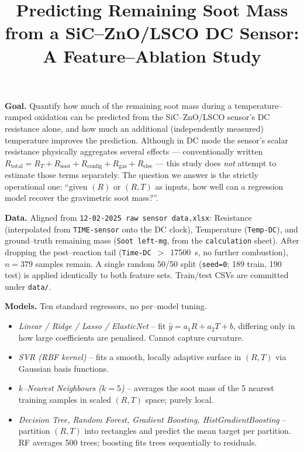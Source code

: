 \documentclass[10pt]{article}
\title{\vspace{-3em}Predicting Remaining Soot Mass from a SiC--ZnO/LSCO DC Sensor:
A Feature--Ablation Study}
\author{}
\date{\vspace{-2.5em}}
\begin{document}
\maketitle
\vspace{-2em}

\textbf{Goal.}
Quantify how much of the remaining soot mass during a temperature--ramped
oxidation can be predicted from the SiC--ZnO/LSCO sensor's DC resistance alone,
and how much an additional (independently measured) temperature improves the
prediction. Although in DC mode the sensor's scalar resistance physically
aggregates several effects --- conventionally written
\(R_{\text{total}} = R_{T} + R_{\text{soot}} + R_{\text{config}} +
R_{\text{gas}} + R_{\text{else}}\) --- this study does \emph{not} attempt to
estimate those terms separately. The question we answer is the strictly
operational one: ``given $(R)$ or $(R,T)$ as inputs, how well can a regression
model recover the gravimetric soot mass?''.

\textbf{Data.}
Aligned from \texttt{12-02-2025 raw sensor data.xlsx}: Resistance (interpolated
from \texttt{TIME-sensor} onto the DC clock), Temperature (\texttt{Temp-DC}),
and ground--truth remaining mass (\texttt{Soot left-mg}, from the
\texttt{calculation} sheet). After dropping the post--reaction tail
(\texttt{Time-DC}~$>$~\SI{17500}{\second}, no further combustion), $n=379$
samples remain. A single random 50/50 split (\texttt{seed=0}; 189 train, 190
test) is applied identically to both feature sets. Train/test CSVs are
committed under \texttt{data/}.

\textbf{Models.}
Ten standard regressors, no per--model tuning.
\begin{itemize}[leftmargin=*, itemsep=0pt, topsep=2pt]
    \item \emph{Linear / Ridge / Lasso / ElasticNet} -- fit
          $\hat y = a_1 R + a_2 T + b$, differing only in how large
          coefficients are penalised. Cannot capture curvature.
    \item \emph{SVR (RBF kernel)} -- fits a smooth, locally adaptive surface in
          $(R,T)$ via Gaussian basis functions.
    \item \emph{$k$--Nearest Neighbours ($k=5$)} -- averages the soot mass of
          the 5 nearest training samples in scaled $(R,T)$ space; purely local.
    \item \emph{Decision Tree, Random Forest, Gradient Boosting,
          HistGradientBoosting} -- partition $(R,T)$ into rectangles and
          predict the mean target per partition. RF averages 500 trees;
          boosting fits trees sequentially to residuals.
\end{itemize}
\end{document}
